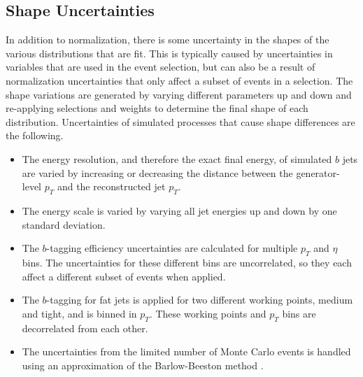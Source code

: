 \subsection{Shape Uncertainties}

In addition to normalization, there is some uncertainty in the shapes of the various distributions that are fit.
This is typically caused by uncertainties in variables that are used in the event selection,
but can also be a result of normalization uncertainties that only affect a subset of events in a selection.
The shape variations are generated by varying different parameters up and down
and re-applying selections and weights to determine the final shape of each distribution.
Uncertainties of simulated processes that cause shape differences are the following.
\begin{itemize}
\item The energy resolution, and therefore the exact final energy,
  of simulated $b$ jets are varied by increasing or decreasing
  the distance between the generator-level $p_T$ and the reconstructed jet $p_T$.
\item The energy scale is varied by varying all jet energies up and down by
  one standard deviation.
\item The $b$-tagging efficiency uncertainties are calculated
  for multiple $p_T$ and $\eta$ bins.
  The uncertainties for these different bins are uncorrelated,
  so they each affect a different subset of events when applied. 
\item The $b$-tagging for fat jets is applied for two different working points,
  medium and tight, and is binned in $p_T$.
  These working points and $p_T$ bins are decorrelated from each other.
\item The uncertainties from the limited number of Monte Carlo events is handled
  using an approximation of the Barlow-Beeston method \cite{BARLOW1993219}.
\end{itemize}
